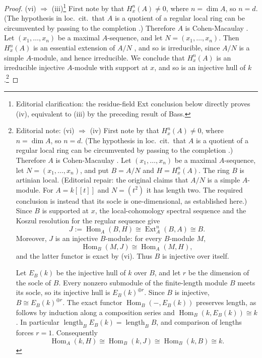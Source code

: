 \begin{proof}
\noindent (vi) $\Longrightarrow$ (iii)\footnote{Editorial clarification: the residue-field Ext conclusion below directly proves (iv), equivalent to (iii) by the preceding result of Bass.} First note by \cite[, part~4]{LC} that $H_{x}^{n}(A)\neq0$, where $n=\dim A$, so $n=d$. (The hypothesis in loc.\ cit.\ that $A$ is a quotient of a regular local ring can be circumvented by passing to the completion \cite[]{LC}.) Therefore $A$ is Cohen-Macaulay \cite[]{LC}. Let $(x_1,\dots,x_n)$ be a maximal $A$-sequence, and let $N=(x_1,\dots,x_n)$. Then $H_{x}^{n}(A)$ is an essential extension of $A/N$ \cite[\nopp proof of Prop.~2]{11}, and so is irreducible, since $A/N$ is a simple $A$-module, and hence irreducible. We conclude that $H_{x}^{n}(A)$ is an irreducible injective $A$-module with support at $x$, and so is an injective hull of $k$ .\footnote{Editorial note: \noindent (vi) $\Longrightarrow$ (iv) First note by \cite[, part~4]{LC} that $H_{x}^{n}(A)\neq0$, where $n=\dim A$, so $n=d$. (The hypothesis in loc.\ cit.\ that $A$ is a quotient of a regular local ring can be circumvented by passing to the completion \cite[]{LC}.) Therefore $A$ is Cohen-Macaulay \cite[]{LC}. Let $(x_1,\dots,x_n)$ be a maximal $A$-sequence, let $N=(x_1,\dots,x_n)$, and put $B=A/N$ and $H=H_x^n(A)$. The ring $B$ is artinian local. (Editorial repair: the original claims that $A/N$ is a simple $A$-module. For $A=k[[t]]$ and $N=(t^2)$ it has length two. The required conclusion is instead that its socle is one-dimensional, as established here.)
Since $B$ is supported at $x$, the local-cohomology spectral sequence and the Koszul resolution for the regular sequence give
\[
J:=\operatorname{Hom}_A(B,H)
 \cong\operatorname{Ext}_A^n(B,A)\cong B.
\]
Moreover, $J$ is an injective $B$-module: for every $B$-module $M$,
\[
\operatorname{Hom}_B(M,J)\cong\operatorname{Hom}_A(M,H),
\]
and the latter functor is exact by (vi). Thus $B$ is injective over itself.\par
Let $E_B(k)$ be the injective hull of $k$ over $B$, and let $r$ be the dimension of the socle of $B$. Every nonzero submodule of the finite-length module $B$ meets its socle, so its injective hull is $E_B(k)^{\oplus r}$. Since $B$ is injective, $B\cong E_B(k)^{\oplus r}$. The exact functor $\operatorname{Hom}_B(-,E_B(k))$ preserves length, as follows by induction along a composition series and $\operatorname{Hom}_B(k,E_B(k))\cong k$. In particular $\operatorname{length}_B E_B(k)=\operatorname{length}_B B$, and comparison of lengths forces $r=1$. Consequently
\[
\operatorname{Hom}_A(k,H)
 \cong\operatorname{Hom}_B(k,J)
 \cong\operatorname{Hom}_B(k,B)\cong k.
\]}


\end{proof}
